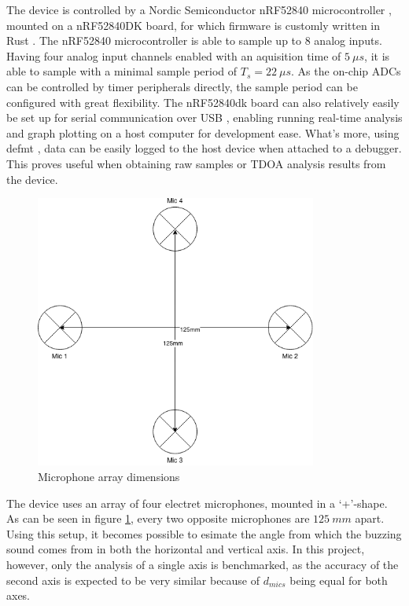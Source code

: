 \documentclass[a4paper]{article}
\begin{document}
The device is controlled by a Nordic Semiconductor nRF52840 microcontroller \cite{nrf52840}, mounted on a nRF52840DK board, for which firmware is customly written in Rust \cite{rust}.  The nRF52840 microcontroller is able to sample up to 8 analog inputs. Having four analog input channels enabled with an aquisition time of $5\ \mu s$, it is able to sample with a minimal sample period of $ T_s = 22\ \mu s$. As the on-chip ADCs can be controlled by timer peripherals directly, the sample period can be configured with great flexibility. The nRF52840dk board can also relatively easily be set up for serial communication over USB \cite{usb}, enabling running real-time analysis and graph plotting on a host computer for development ease. What's more, using defmt \cite{defmt}, data can be easily logged to the host device when attached to a debugger. This proves useful when obtaining raw samples or TDOA analysis results from the device.

\begin{figure}[H]
    \begin{center}
        \includegraphics[width=25em]{assets/mic_array_dimensions.png}
        \caption{Microphone array dimensions}
        \label{fig:mic_array_dimensions}
    \end{center}
\end{figure}

The device uses an array of four electret microphones, mounted in a `+'-shape. As can be seen in figure \ref{fig:mic_array_dimensions}, every two opposite microphones are $125\ mm$ apart. Using this setup, it becomes possible to esimate the angle from which the buzzing sound comes from in both the horizontal and vertical axis. In this project, however, only the analysis of a single axis is benchmarked, as the accuracy of the second axis is expected to be very similar because of $d_{mics}$ being equal for both axes.
\end{document}
